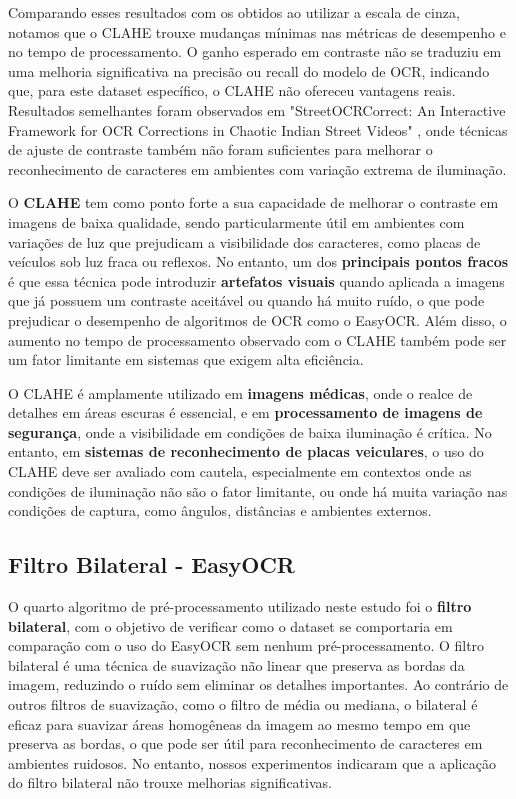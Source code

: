 \documentclass[conference]{IEEEtran}
\begin{document}
Comparando esses resultados com os obtidos ao utilizar a escala de cinza, notamos que o CLAHE trouxe mudanças mínimas nas métricas de desempenho e no tempo de processamento. O ganho esperado em contraste não se traduziu em uma melhoria significativa na precisão ou recall do modelo de OCR, indicando que, para este dataset específico, o CLAHE não ofereceu vantagens reais. Resultados semelhantes foram observados em "StreetOCRCorrect: An Interactive Framework for OCR Corrections in Chaotic Indian Street Videos" \cite{b13}, onde técnicas de ajuste de contraste também não foram suficientes para melhorar o reconhecimento de caracteres em ambientes com variação extrema de iluminação.

O \textbf{CLAHE} tem como ponto forte a sua capacidade de melhorar o contraste em imagens de baixa qualidade, sendo particularmente útil em ambientes com variações de luz que prejudicam a visibilidade dos caracteres, como placas de veículos sob luz fraca ou reflexos. No entanto, um dos \textbf{principais pontos fracos} é que essa técnica pode introduzir \textbf{artefatos visuais} quando aplicada a imagens que já possuem um contraste aceitável ou quando há muito ruído, o que pode prejudicar o desempenho de algoritmos de OCR como o EasyOCR. Além disso, o aumento no tempo de processamento observado com o CLAHE também pode ser um fator limitante em sistemas que exigem alta eficiência.

O CLAHE é amplamente utilizado em \textbf{imagens médicas}, onde o realce de detalhes em áreas escuras é essencial, e em \textbf{processamento de imagens de segurança}, onde a visibilidade em condições de baixa iluminação é crítica. No entanto, em \textbf{sistemas de reconhecimento de placas veiculares}, o uso do CLAHE deve ser avaliado com cautela, especialmente em contextos onde as condições de iluminação não são o fator limitante, ou onde há muita variação nas condições de captura, como ângulos, distâncias e ambientes externos.


\subsection{Filtro Bilateral - EasyOCR}


O quarto algoritmo de pré-processamento utilizado neste estudo foi o \textbf{filtro bilateral}, com o objetivo de verificar como o dataset se comportaria em comparação com o uso do EasyOCR sem nenhum pré-processamento. O filtro bilateral é uma técnica de suavização não linear que preserva as bordas da imagem, reduzindo o ruído sem eliminar os detalhes importantes. Ao contrário de outros filtros de suavização, como o filtro de média ou mediana, o bilateral é eficaz para suavizar áreas homogêneas da imagem ao mesmo tempo em que preserva as bordas, o que pode ser útil para reconhecimento de caracteres em ambientes ruidosos. No entanto, nossos experimentos indicaram que a aplicação do filtro bilateral não trouxe melhorias significativas.
\end{document}

